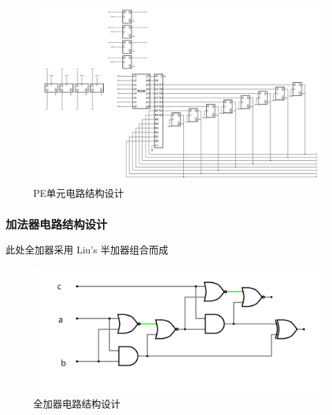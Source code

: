 \documentclass{article}
\begin{document}
\begin{figure}[H]
    \centering
    \includegraphics[width=1\textwidth]{脉动阵列.pdf}
    \caption{PE单元电路结构设计}
\end{figure}


\subsubsection{加法器电路结构设计}

此处全加器采用 Liu's 半加器组合而成

\begin{figure}[H]
    \centering
    \includegraphics[width=1\textwidth]{微信图片_20250612132911.png}
    \caption{全加器电路结构设计}
\end{figure}
\end{document}
